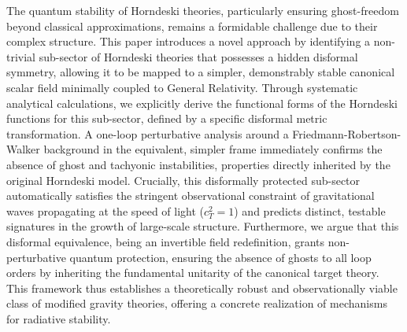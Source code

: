 \documentclass[twocolumn]{aastex631}
\begin{document}
The quantum stability of Horndeski theories, particularly ensuring ghost-freedom beyond classical approximations, remains a formidable challenge due to their complex structure. This paper introduces a novel approach by identifying a non-trivial sub-sector of Horndeski theories that possesses a hidden disformal symmetry, allowing it to be mapped to a simpler, demonstrably stable canonical scalar field minimally coupled to General Relativity. Through systematic analytical calculations, we explicitly derive the functional forms of the Horndeski functions for this sub-sector, defined by a specific disformal metric transformation. A one-loop perturbative analysis around a Friedmann-Robertson-Walker background in the equivalent, simpler frame immediately confirms the absence of ghost and tachyonic instabilities, properties directly inherited by the original Horndeski model. Crucially, this disformally protected sub-sector automatically satisfies the stringent observational constraint of gravitational waves propagating at the speed of light ($c_T^2=1$) and predicts distinct, testable signatures in the growth of large-scale structure. Furthermore, we argue that this disformal equivalence, being an invertible field redefinition, grants non-perturbative quantum protection, ensuring the absence of ghosts to all loop orders by inheriting the fundamental unitarity of the canonical target theory. This framework thus establishes a theoretically robust and observationally viable class of modified gravity theories, offering a concrete realization of mechanisms for radiative stability.
\end{document}
